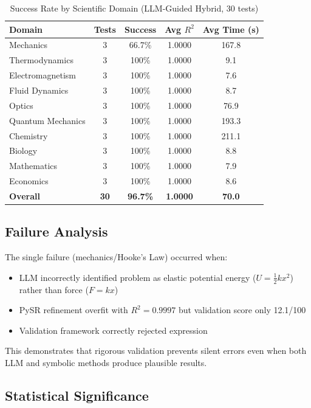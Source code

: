 \documentclass[twoside,11pt]{article}
\begin{document}
\begin{table}[htbp]
\centering
\caption{Success Rate by Scientific Domain (LLM-Guided Hybrid, 30 tests)}
\label{tab:domain_performance}
\begin{tabular}{@{}lcccc@{}}
\toprule
\textbf{Domain} & \textbf{Tests} & \textbf{Success} & \textbf{Avg $R^2$} & \textbf{Avg Time (s)} \\
\midrule
Mechanics & 3 & 66.7\% & 1.0000 & 167.8 \\
Thermodynamics & 3 & 100\% & 1.0000 & 9.1 \\
Electromagnetism & 3 & 100\% & 1.0000 & 7.6 \\
Fluid Dynamics & 3 & 100\% & 1.0000 & 8.7 \\
Optics & 3 & 100\% & 1.0000 & 76.9 \\
Quantum Mechanics & 3 & 100\% & 1.0000 & 193.3 \\
Chemistry & 3 & 100\% & 1.0000 & 211.1 \\
Biology & 3 & 100\% & 1.0000 & 8.8 \\
Mathematics & 3 & 100\% & 1.0000 & 7.9 \\
Economics & 3 & 100\% & 1.0000 & 8.6 \\
\midrule
\textbf{Overall} & \textbf{30} & \textbf{96.7\%} & \textbf{1.0000} & \textbf{70.0} \\
\bottomrule
\end{tabular}
\end{table}

\subsection{Failure Analysis}

The single failure (mechanics/Hooke's Law) occurred when:
\begin{itemize}
\item LLM incorrectly identified problem as elastic potential energy ($U = \frac{1}{2}kx^2$) rather than force ($F = kx$)
\item PySR refinement overfit with $R^2 = 0.9997$ but validation score only 12.1/100
\item Validation framework correctly rejected expression
\end{itemize}

This demonstrates that rigorous validation prevents silent errors even when both LLM and symbolic methods produce plausible results.

\subsection{Statistical Significance}
\end{document}
